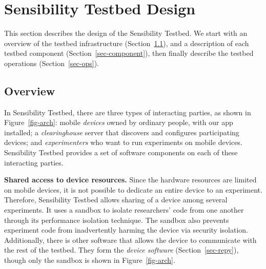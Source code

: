 \section{Sensibility Testbed Design}\label{sec-design}

This section describes the design of the Sensibility Testbed. 
We start with
an overview of the testbed infrastructure (Section~\ref{sec-overview}), 
and a description of each testbed component 
(Section~\ref{sec-component}), then finally describe the testbed operations 
(Section~\ref{sec-ops}).


\subsection{Overview}\label{sec-overview}

In Sensibility Testbed, there are three types of interacting
parties, as shown in Figure~\ref{fig-arch}: mobile \textit{devices} 
owned by ordinary people, with our app installed; a 
\textit{clearinghouse} server that discovers and configures
participating devices; and \textit{experimenters} who want to run
experiments on mobile devices. Sensibility Testbed provides 
a set of software components on each of these interacting
parties.


\textbf{Shared access to device resources.} 
Since the hardware resources are limited on mobile devices, it is 
not possible to dedicate an entire device to an experiment. Therefore, 
Sensibility Testbed allows sharing of a device among several 
experiments. It uses a sandbox to isolate researchers' code from 
one another through its performance isolation technique. The sandbox 
also prevents experiment code from inadvertently harming the device
via security isolation. Additionally, there is other software that allows
the device to communicate with the rest of the testbed. They form the
\textit{device software} (Section~\ref{sec-repy}), though only the 
sandbox is shown in Figure~\ref{fig-arch}.

